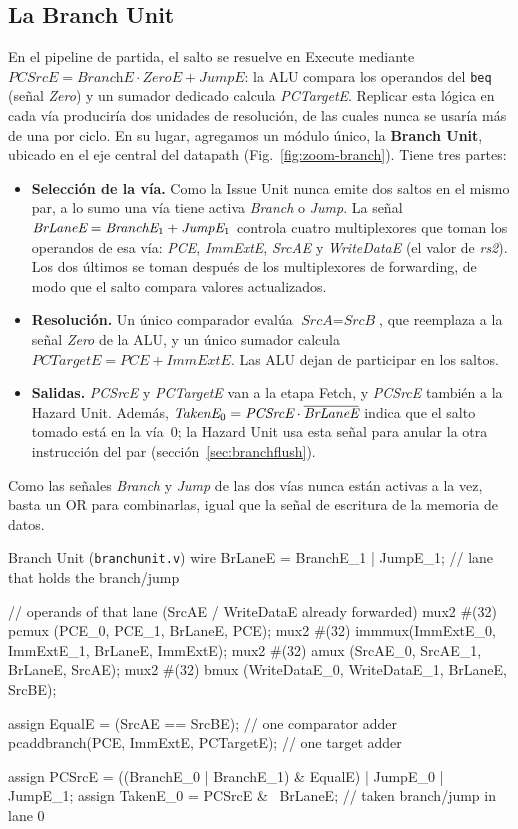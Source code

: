 \documentclass[11pt,a4paper]{article}
\newcommand{\sig}[1]{\textit{#1}}
\newcommand{\sigk}[2]{\textit{#1}\textsubscript{#2}}
\newcommand{\ins}[1]{\texttt{#1}}
\newcounter{hdl}
\begin{document}
\subsection{La Branch Unit}
\label{sec:branchunit}

En el pipeline de partida, el salto se resuelve en Execute mediante
$\sig{PCSrcE} = \sig{BranchE}\cdot\sig{ZeroE} + \sig{JumpE}$: la ALU compara los operandos
del \ins{beq} (señal \sig{Zero}) y un sumador dedicado calcula \sig{PCTargetE}. Replicar
esta lógica en cada vía produciría dos unidades de resolución, de las cuales nunca se
usaría más de una por ciclo. En su lugar, agregamos un módulo único, la
\textbf{Branch Unit}, ubicado en el eje central del datapath (Fig.~\ref{fig:zoom-branch}).
Tiene tres partes:
\begin{itemize}
  \item \textbf{Selección de la vía.} Como la Issue Unit nunca emite dos saltos en el
        mismo par, a lo sumo una vía tiene activa \sig{Branch} o \sig{Jump}. La señal
        $\sig{BrLaneE} = \sigk{BranchE}{1} + \sigk{JumpE}{1}$ controla cuatro
        multiplexores que toman los operandos de esa vía: \sig{PCE}, \sig{ImmExtE},
        \sig{SrcAE} y \sig{WriteDataE} (el valor de \sig{rs2}). Los dos últimos se toman
        después de los multiplexores de forwarding, de modo que el salto compara valores
        actualizados.
  \item \textbf{Resolución.} Un único comparador evalúa $\sig{SrcA} = \sig{SrcB}$, que
        reemplaza a la señal \sig{Zero} de la ALU, y un único sumador calcula
        $\sig{PCTargetE} = \sig{PCE} + \sig{ImmExtE}$. Las ALU dejan de participar en los
        saltos.
  \item \textbf{Salidas.} \sig{PCSrcE} y \sig{PCTargetE} van a la etapa Fetch, y
        \sig{PCSrcE} también a la Hazard Unit. Además, $\sigk{TakenE}{0} = \sig{PCSrcE}\cdot\overline{\sig{BrLaneE}}$
        indica que el salto tomado está en la vía~0; la Hazard Unit usa esta señal para
        anular la otra instrucción del par (sección~\ref{sec:branchflush}).
\end{itemize}
Como las señales \sig{Branch} y \sig{Jump} de las dos vías nunca están activas a la vez,
basta un OR para combinarlas, igual que la señal de escritura de la memoria de datos.

\begin{hdl}{Branch Unit (\texttt{branchunit.v})}
wire BrLaneE = BranchE_1 | JumpE_1;             // lane that holds the branch/jump

// operands of that lane (SrcAE / WriteDataE already forwarded)
mux2 #(32) pcmux (PCE_0,        PCE_1,        BrLaneE, PCE);
mux2 #(32) immmux(ImmExtE_0,    ImmExtE_1,    BrLaneE, ImmExtE);
mux2 #(32) amux  (SrcAE_0,      SrcAE_1,      BrLaneE, SrcAE);
mux2 #(32) bmux  (WriteDataE_0, WriteDataE_1, BrLaneE, SrcBE);

assign EqualE    = (SrcAE == SrcBE);            // one comparator
adder pcaddbranch(PCE, ImmExtE, PCTargetE);     // one target adder

assign PCSrcE    = ((BranchE_0 | BranchE_1) & EqualE) | JumpE_0 | JumpE_1;
assign TakenE_0  = PCSrcE & ~BrLaneE;           // taken branch/jump in lane 0
\end{hdl}
\end{document}
